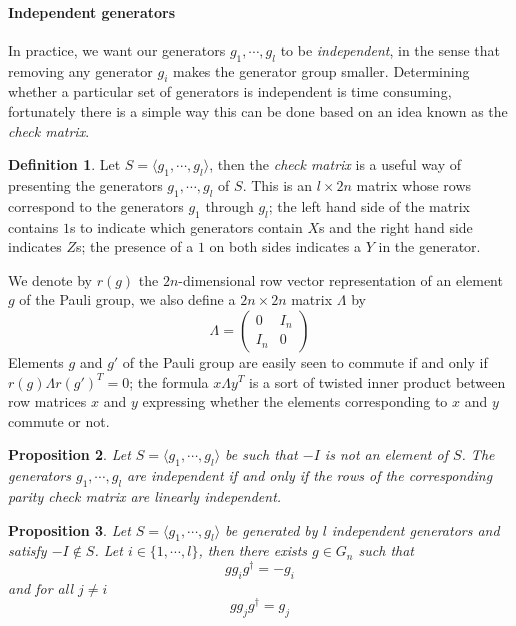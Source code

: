 \documentclass[11pt,a4paper]{article}
\theoremstyle{definition}
\newtheorem{definition}{Definition}[section]
\theoremstyle{plain}
\newtheorem{proposition}[definition]{Proposition}
\theoremstyle{remark}
\begin{document}
\paragraph{Independent generators}
In practice, we want our generators $g_1, \cdots, g_l$ to be \emph{independent}, in the sense that 
removing any generator $g_i$ makes the generator group smaller. 
Determining whether a particular set of generators is independent is time consuming, fortunately 
there is a simple way this can be done based on an idea known as the \emph{check matrix}.

\begin{definition}
    Let $S = \langle g_1, \cdots, g_l \rangle$, then the \emph{check matrix} is a useful way of presenting the 
    generators $g_1, \cdots, g_l$ of $S$. 
    This is an $l \times 2n$ matrix whose rows correspond to the generators $g_1$ through $g_l$; 
    the left hand side of the matrix contains $1$s to indicate which generators contain $X$s and the right hand side 
    indicates $Z$s; the presence of a $1$ on both sides indicates a $Y$ in the generator.
\end{definition}

We denote by $r(g)$ the $2n$-dimensional row vector representation of an element $g$ of the Pauli group, 
we also define a $2n \times 2n$ matrix $\Lambda$ by 
$$ \Lambda = \begin{pmatrix}
    0 & I_n \\
    I_n & 0
\end{pmatrix}$$ 
Elements $g$ and $g'$ of the Pauli group are easily seen to commute if and only if $r(g) \Lambda r(g')^T = 0$; 
the formula $x \Lambda y^T$ is a sort of twisted inner product between row matrices $x$ and $y$ expressing whether the elements 
corresponding to $x$ and $y$ commute or not. 

\begin{proposition}
    Let $S = \langle g_1, \cdots, g_l\rangle$ be such that $-I$ is not an element of $S$. 
    The generators $g_1, \cdots, g_l$ are independent if and only if the rows of the 
    corresponding parity check matrix are linearly independent. 
\end{proposition}

\begin{proposition}
    Let $S = \langle g_1, \cdots, g_l\rangle$ be generated by $l$ independent generators and satisfy $-I \not\in S$. 
    Let $i \in \{1, \cdots, l\}$, then there exists $g \in G_n$ such that 
    $$g g_i g^\dagger = - g_i$$
    and for all $j \neq i$ 
    $$g g_j g^\dagger = g_j$$
\end{proposition}
\end{document}
